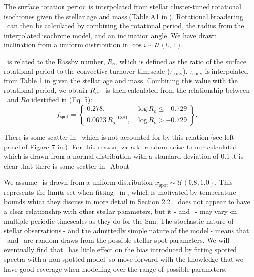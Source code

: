The surface rotation period is interpolated from stellar cluster-tuned rotational isochrones given the stellar age and mass (Table A1 in \citet{spada_angular_2016}). Rotational broadening \vsini\ can then be calculated by combining the rotational period, the radius from the interpolated isochrone model, and an inclination angle. We have drawn inclination from a uniform distribution in $\cos{i} \sim \mathcal{U}(0, 1)$.

\fspot\ is related to the Rossby number, $R_o$, which is defined as the ratio of the surface rotational period to the convective turnover timescale ($\tau_{\textrm{conv}}$). $\tau_{\textrm{conv}}$ is interpolated from Table 1 in \citet{landin_theoretical_2010} given the stellar age and mass. Combining this value with the rotational period, we obtain $R_o$. \fspot\ is then calculated from the relationship between \fspot\ and $Ro$ identified in \citet{cao_starspots_2022} (Eq. 5):
\begin{equation}
f_{\text{spot}} = 
\left\{
    \begin{array}{lr}
        0.278, & \log{R_o} \leq -0.729 \\
        0.0623\ R_o^{-0.881}, & \log{R_o} > -0.729
    \end{array}
\right\}.
\end{equation}

There is some scatter in \fspot\, which is not accounted for by this relation (see left panel of Figure 7 in \citet{cao_starspots_2022}). For this reason, we add random noise to our calculated \fspot\, which is drawn from a normal distribution with a standard deviation of 0.1
it is clear that there is some scatter in \fspot\ About 

We assume \xspot\ is drawn from a uniform distribution $x_{\text{spot}} \sim \mathcal{U}(0.8, 1.0)$. This represents the limits set when fitting \xspot\ in \citep{cao_starspots_2022}, which is motivated by temperature bounds which they discuss in more detail in Section 2.2. \xspot\ does not appear to have a clear relationship with other stellar parameters, but it - and \fspot\ - may vary on multiple periodic timescales as they do for the Sun. The stochastic nature of stellar observations - and the admittedly simple nature of the model - means that \fspot\ and \xspot\ are random draws from the possible stellar spot parameters. We will eventually find that \xspot\ has little effect on the bias introduced by fitting spotted spectra with a non-spotted model, so move forward with the knowledge that we have good coverage when modelling over the range of possible parameters.

